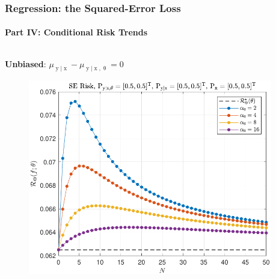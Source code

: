 \documentclass[aspectratio=169,usenames,dvipsnames]{beamer}
\DeclareMathOperator{\xrm}{\mathrm{x}}
\DeclareMathOperator{\yrm}{\mathrm{y}}
\begin{document}
\begin{frame}
\frametitle{Regression: the Squared-Error Loss}
\framesubtitle{Part IV: Conditional Risk Trends}

\begin{columns}[c]

\begin{column}{0.5\linewidth}

\centering
\textbf{Unbiased}: $\mu_{\yrm | \xrm} - \mu_{\yrm | \xrm,\uptheta} = 0$
%
\begin{figure}
\centering
\includegraphics[width=1\linewidth]{Risk_cond_SE_Dir_N_leg_a0_unbiased.pdf}
\end{figure}


\end{column}

\begin{column}{0.5\linewidth}


\end{column}
\end{columns}
\end{frame}
\end{document}
